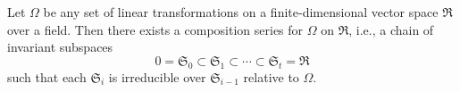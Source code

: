Let $\Omega$ be any set of linear transformations on a finite-dimensional vector space $\mathfrak{R}$ over a field. Then there exists a composition series for $\Omega$ on $\mathfrak{R}$, i.e., a chain of invariant subspaces
$$0 = \mathfrak{S}_0 \subset \mathfrak{S}_1 \subset \cdots \subset \mathfrak{S}_t = \mathfrak{R}$$
such that each $\mathfrak{S}_i$ is irreducible over $\mathfrak{S}_{i-1}$ relative to $\Omega$.
